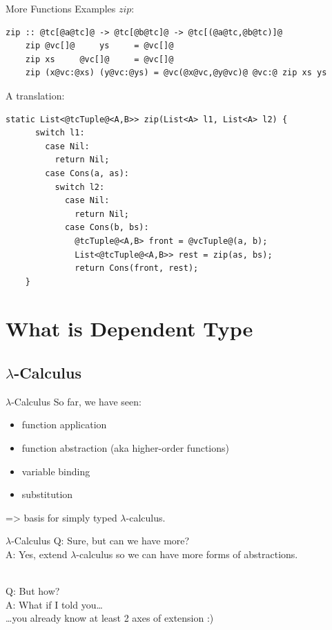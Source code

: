 \documentclass[xcolor={usenames,dvipsnames}]{beamer}
\begin{document}
\begin{frame}[fragile]{More Functions Examples}
  $zip$:
  \begin{lstlisting}[style=hask]
    zip :: @tc[@a@tc]@ -> @tc[@b@tc]@ -> @tc[(@a@tc,@b@tc)]@
    zip @vc[]@     ys     = @vc[]@
    zip xs     @vc[]@     = @vc[]@
    zip (x@vc:@xs) (y@vc:@ys) = @vc(@x@vc,@y@vc)@ @vc:@ zip xs ys
  \end{lstlisting}

  \pause
  A translation:
  \begin{lstlisting}[style=hask]
    static List<@tcTuple@<A,B>> zip(List<A> l1, List<A> l2) {
      switch l1:
        case Nil:
          return Nil;
        case Cons(a, as):
          switch l2:
            case Nil:
              return Nil;
            case Cons(b, bs):
              @tcTuple@<A,B> front = @vcTuple@(a, b);
              List<@tcTuple@<A,B>> rest = zip(as, bs);
              return Cons(front, rest);
    }
  \end{lstlisting}
\end{frame}

\section{What is Dependent Type}

\subsection{$\lambda$-Calculus}

\begin{frame}[fragile]{$\lambda$-Calculus}
  So far, we have seen:
  \pause
  \begin{itemize}
    \item function application
    \item function abstraction {\tiny(aka higher-order functions)}
    \pause
    \item variable binding
    \pause
    \item substitution
  \end{itemize}
  \pause
  => basis for simply typed $\lambda$-calculus.
\end{frame}


\begin{frame}[fragile]{$\lambda$-Calculus}
  Q: Sure, but can we have more?
  \ \\
  \pause
  A: Yes, extend $\lambda$-calculus so we can have more forms of abstractions.

  \ \\
  \pause
  Q: But how?\\
  \pause
  A: What if I told you\ldots\\
  \pause
  \qquad \ldots you already know at least 2 axes of extension :)
\end{frame}
\end{document}

